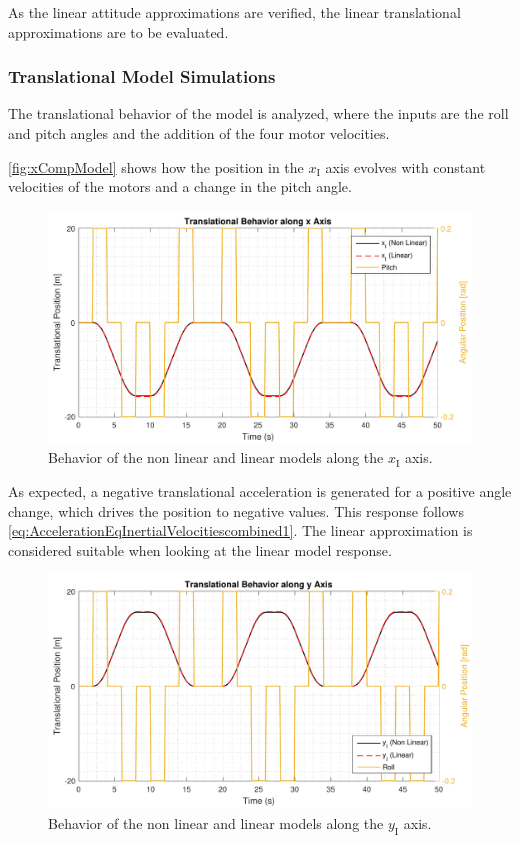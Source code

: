 As the linear attitude approximations are verified, the linear translational approximations are to be evaluated. 
\subsubsection{Translational Model Simulations}
The translational behavior of the model is analyzed, where the inputs are the roll and pitch angles and the addition of the four motor velocities. 

\autoref{fig:xCompModel} shows how the position in the $x_{\mathrm{I}}$ axis evolves with constant velocities of the motors and a change in the pitch angle.
\vspace{-0.4 cm}
\begin{figure}[H]
	\centering
	\includegraphics[scale=0.62]{figures/xCompModel}
	\caption{Behavior of the non linear and linear models along the $x_{\mathrm{I}}$ axis.}
	\label{fig:xCompModel}
\end{figure}
\vspace{-0.8 cm}
As expected, a negative translational acceleration is generated for a positive angle change, which drives the position to negative values. This response follows \autoref{eq:AccelerationEqInertialVelocitiescombined1}. The linear approximation is considered suitable when looking at the linear model response.
\vspace{-0.4 cm}
\begin{figure}[H]
	\centering
	\includegraphics[scale=0.62]{figures/yCompModel}
	\caption{Behavior of the non linear and linear models along the $y_{\mathrm{I}}$ axis.}
	\label{fig:yCompModel}
\end{figure}
